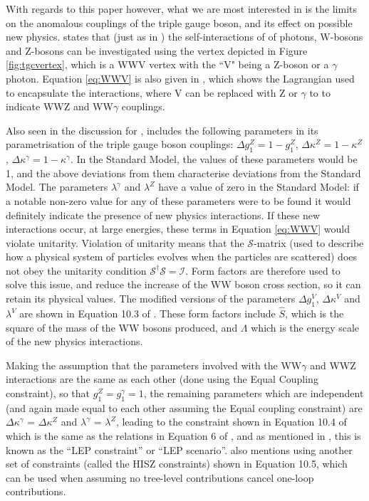 \documentclass[11pt,oneside,a4paper]{article}
\begin{document}
With regards to this paper however, what we are most interested in is the limits on the anomalous couplings of the triple gauge boson, and its effect on possible new physics. \cite{WWtgc} states that (just as in \cite{higgsdata}) the self-interactions of of photons, W-bosons and Z-bosons can be investigated using the vertex depicted in Figure \ref{fig:tgcvertex}, which is a WWV vertex with the ``V" being a Z-boson or a $\gamma$ photon. Equation \ref{eq:WWV} is also given in \cite{WWtgc}, which shows the Lagrangian used to encapsulate the interactions, where V can be replaced with Z or $\gamma$ to to indicate WWZ and WW$\gamma$ couplings.

Also seen in the discussion for \cite{higgsdata}, \cite{WWtgc} includes the following parameters in its parametrisation of the triple gauge boson couplings: $\Delta g^{Z}_{1} = 1 - g^{Z}_{1}$, $\Delta\kappa^{Z} = 1 - \kappa^{Z}$, $\Delta\kappa^{\gamma} = 1- \kappa^{\gamma}$. In the Standard Model, the values of these parameters would be 1, and the above deviations from them characterise deviations from the Standard Model. The parameters $\lambda^{\gamma}$ and $\lambda^{Z}$ have a value of zero in the Standard Model: if a notable non-zero value for any of these parameters were to be found it would definitely indicate the presence of new physics interactions. If these new interactions occur, at large energies, these terms in Equation \ref{eq:WWV} would violate unitarity. Violation of unitarity means that the $\mathcal{S}$-matrix (used to describe how a physical system of particles evolves when the particles are scattered) does not obey the unitarity condition $\mathcal{S}^{\dagger}\mathcal{S} = \mathcal{I}$. Form factors are therefore used to solve this issue, and reduce the increase of the WW boson cross section, so it can retain its physical values. The modified versions of the parameters $\Delta g^{V}_{1}$, $\Delta\kappa^{V}$ and $\lambda^{V}$ are shown in Equation 10.3 of \cite{WWtgc}. These form factors include $\hat{S}$, which is the square of the mass of the WW bosons produced, and $\Lambda$ which is the energy scale of the new physics interactions. 


Making the assumption that the parameters involved with the WW$\gamma$ and WWZ interactions are the same as each other (done using the Equal Coupling constraint), so that $g^{Z}_{1} = g^{\gamma}_{1} = 1$, the remaining parameters which are independent (and again made equal to each other assuming the Equal coupling constraint) are $\Delta\kappa^{\gamma}$ = $\Delta\kappa^{Z}$ and $\lambda^{\gamma}$ = $\lambda^{Z}$, leading to the constraint shown in Equation 10.4 of \cite{WWtgc} which is the same as the relations in Equation 6 of \cite{higgsdata}, and as mentioned in \cite{higgsdata}, this is known as the ``LEP constraint'' or ``LEP scenario''.\cite{WWtgc} also mentions using another set of constraints (called the HISZ constraints) shown in Equation 10.5, which can be used when assuming no tree-level contributions cancel one-loop contributions.
\end{document}
